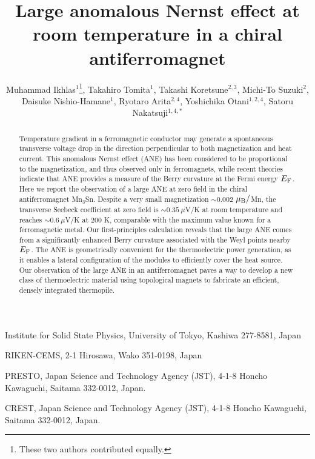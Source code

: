 \documentclass[amsmath,amssymb]{nature}
\title{Large anomalous Nernst effect at room temperature in a chiral antiferromagnet}
\author{Muhammad Ikhlas$^1$\footnote[1]{These two authors contributed equally.}, Takahiro Tomita$^1$\footnotemark[1], Takashi Koretsune$^{2,3}$, Michi-To Suzuki$^{2}$, Daisuke Nishio-Hamane$^1$, Ryotaro Arita$^{2,4}$, Yoshichika Otani$^{1,2,4}$, Satoru Nakatsuji$^{1,4,*}$\\}
\begin{document}
	
	\maketitle
	
	\begin{affiliations}
		\item Institute for Solid State Physics, University of Tokyo, Kashiwa 277-8581, Japan
		\item RIKEN-CEMS, 2-1 Hirosawa, Wako 351-0198, Japan		
		\item PRESTO, Japan Science and Technology Agency (JST), 4-1-8 Honcho Kawaguchi, Saitama 332-0012, Japan.
		\item CREST, Japan Science and Technology Agency (JST), 4-1-8 Honcho Kawaguchi, Saitama 332-0012, Japan.		
		

	\end{affiliations}

\begin{abstract}
Temperature gradient in a ferromagnetic conductor may generate a spontaneous transverse voltage drop in the direction perpendicular to both magnetization and heat current. This anomalous Nernst effect (ANE) has been considered to be proportional to the magnetization\cite{Smith1911,Kondorskii1964,Lee2004,Miyasato2007,Yong2008,Sakuraba2013,Hasegawa2015}, and thus observed only in ferromagnets, while recent theories indicate that  ANE provides a measure of the Berry curvature at the Fermi energy  $E_{\rm F}$\cite{Xiao2006,Niu2010}. Here we report the observation of a large ANE at zero field in the chiral antiferromagnet Mn$_3$Sn\cite{Mn3Sn}.  Despite a very small magnetization $\sim 0.002$ $\mu_{\rm B}/$Mn, the transverse Seebeck coefficient at zero field is $\sim 0.35~\mu$V/K at room temperature and reaches $\sim 0.6~\mu$V/K at 200 K, comparable with the maximum value known for a ferromagnetic metal.  Our first-principles calculation reveals that the large ANE comes from a significantly enhanced Berry curvature associated with the Weyl points nearby $E_{\rm F}$\cite{Yang2016}. 
The ANE is geometrically convenient for the thermoelectric power generation, as it enables a lateral configuration of the modules to efficiently cover the heat source\cite{Sakuraba2013}. Our observation of the large ANE in an antiferromagnet paves a way to develop a new class of thermoelectric material using topological magnets to fabricate an efficient, densely integrated thermopile.
\end{abstract}
\end{document}
